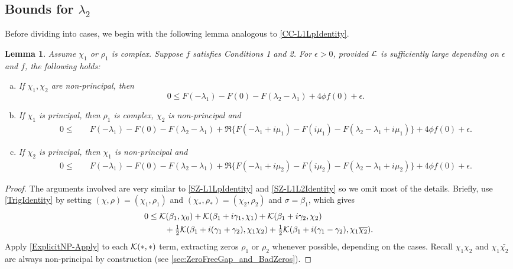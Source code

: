 \documentclass[12pt,psamsfonts]{amsart}
\newtheorem{lem}[thm]{Lemma}
\theoremstyle{definition}
\theoremstyle{remark}
\numberwithin{equation}{section}
\begin{document}
\subsection{Bounds for $\lambda_2$}
Before dividing into cases, we begin with the following lemma analogous to \cref{CC-L1LpIdentity}. 
\begin{lem} \label{CC-L1L2Identity} Assume $\chi_1$ or $\rho_1$ is complex. Suppose $f$ satisfies Conditions 1 and 2. For $\epsilon > 0$, provided $\mathcal{L}$ is sufficiently large depending on $\epsilon$ and $f$,  the following holds: 

\begin{enumerate}[(a)]
	\item If $\chi_1,\chi_2$ are non-principal, then
\[
0 \leq F(-\lambda_1) - F(0) - F(\lambda_2-\lambda_1) + 4\phi f(0)+\epsilon.
\]
	\item If $\chi_1$ is principal, then $\rho_1$ is complex, $\chi_2$ is non-principal and  
	\begin{align*}
0 \leq & \quad F(-\lambda_1)  - F(0) - F(\lambda_2-\lambda_1) + \Re\{ F(-\lambda_1 + i\mu_1) - F(i\mu_1) - F(\lambda_2-\lambda_1+i\mu_1)  \} + 4\phi f(0)+\epsilon.
\end{align*}
	\item If $\chi_2$ is principal, then $\chi_1$ is non-principal and
	\	\begin{align*}
0 \leq & \quad F(-\lambda_1)  - F(0) - F(\lambda_2-\lambda_1) + \Re\{ F(-\lambda_1 + i\mu_2) - F(i\mu_2) - F(\lambda_2-\lambda_1+i\mu_2)  \} + 4\phi f(0) +\epsilon.
\end{align*}
\end{enumerate}
\end{lem}
\begin{proof} The arguments involved are very similar to \cref{SZ-L1LpIdentity} and \cref{SZ-L1L2Identity} so we omit most of the details. Briefly, use \eqref{TrigIdentity} by setting $(\chi, \rho) = (\chi_1, \rho_1)$ and $(\chi_*, \rho_*)  = (\chi_2, \rho_2)$ and $\sigma = \beta_1$, which gives
\begin{equation}
\begin{aligned}
0 & \leq \mathcal{K}(\beta_1, \chi_0)  + \mathcal{K}(\beta_1+i\gamma_1, \chi_1) + \mathcal{K}(\beta_1 + i\gamma_2, \chi_2)  \\
& \qquad + \tfrac{1}{2} \mathcal{K}(\beta_1+ i(\gamma_1+\gamma_2), \chi_1\chi_2) + \tfrac{1}{2}\mathcal{K}(\beta_1+ i(\gamma_1-\gamma_2), \chi_1\overline{\chi_2}).
\end{aligned}
\label{TI-CC-L2}
\end{equation}
Apply \cref{ExplicitNP-Apply} to each $\mathcal{K}(\ast, \ast)$ term, extracting zeros $\rho_1$ or $\rho_2$ whenever possible, depending on the cases. Recall $\chi_1\chi_2$ and $\chi_1\bar{\chi_2}$ are always non-principal by construction (see \cref{sec:ZeroFreeGap_and_BadZeros}).  
\end{proof}
\end{document}
